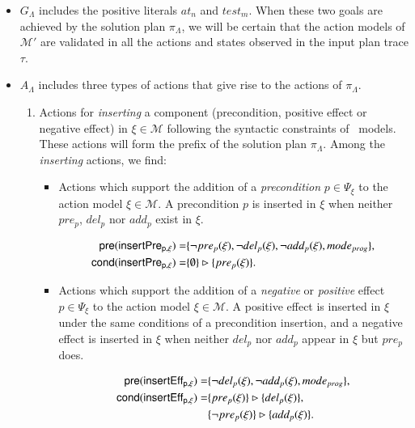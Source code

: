 \begin{itemize}
\item $G_{\Lambda}$ includes the positive literals $at_n$ and $test_m$. When these two goals are achieved by the solution plan $\pi_\Lambda$, we will be certain that the action models of $\mathcal{M'}$ are validated in all the actions and states observed in the input plan trace $\tau$.

\item $A_{\Lambda}$ includes \textcolor[rgb]{1.00,0.00,0.00}{three types of actions that give rise to the actions of $\pi_\Lambda$}.
\begin{enumerate}
\item Actions for \textcolor[rgb]{1.00,0.00,0.00}{{\em inserting} a component (precondition, positive effect or negative effect) in $\xi \in \mathcal{M}$ following the syntactic constraints of \strips\ models}. These actions will form the prefix of the solution plan $\pi_\Lambda$. Among the \emph{inserting} actions, we find:
\begin{itemize}
\item Actions which support the addition of a {\em precondition} $p\in \Psi_{\xi}$ to the action model $\xi\in\mathcal{M}$. \textcolor[rgb]{1.00,0.00,0.00}{A precondition $p$ is inserted in $\xi$ when neither $pre_p$, $del_p$ nor $add_p$ exist in $\xi$.}

\begin{small}
\begin{align*}
\hspace*{7pt}\mathsf{pre}(\mathsf{insertPre_{p,\xi}})=&\{\neg pre_{p}(\xi), \neg del_{p}(\xi),\neg add_{p}(\xi), mode_{prog}\},\\
\mathsf{cond}(\mathsf{insertPre_{p,\xi}})=&\{\emptyset\}\rhd\{pre_{p}(\xi)\}.
\end{align*}
\end{small}

\item Actions which support the addition of a {\em negative} or {\em positive} effect $p\in \Psi_{\xi}$ to the action model $\xi\in\mathcal{M}$. \textcolor[rgb]{1.00,0.00,0.00}{A positive effect is inserted in $\xi$ under the same conditions of a precondition insertion, and a negative effect is inserted in $\xi$ when neither $del_p$ nor $add_p$ appear in $\xi$ but $pre_p$ does.}

\begin{small}
\begin{align*}
\hspace*{7pt}\mathsf{pre}(\mathsf{insertEff_{p,\xi}})=&\{\neg del_{p}(\xi),\neg add_{p}(\xi), mode_{prog}\},\\
\mathsf{cond}(\mathsf{insertEff_{p,\xi}})=&\{pre_{p}(\xi)\}\rhd\{del_{p}(\xi)\},\\
& \{\neg pre_{p}(\xi)\}\rhd\{add_{p}(\xi)\}.
\end{align*}
\end{small}
\end{itemize}


\end{enumerate}
\end{itemize}
